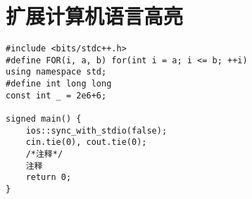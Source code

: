 \documentclass[12pt,A4paper,oneside]{ctexbook}
\begin{document}
\section{扩展计算机语言高亮}







\begin{lstlisting}[style = c++,title = \centering{\huge{6}}]
#include <bits/stdc++.h>
#define FOR(i, a, b) for(int i = a; i <= b; ++i)
using namespace std;
#define int long long
const int _ = 2e6+6;

signed main() {
	ios::sync_with_stdio(false);
	cin.tie(0), cout.tie(0);
	/*注释*/
	注释
	return 0;
}
\end{lstlisting}
\end{document}
